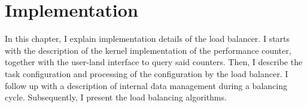 \chapter{Implementation}
\label{sec:implementation}


In this chapter, I explain implementation details of the load balancer.
I starts with the description of the kernel implementation of the performance
counter, together with the user-land interface to query said counters.
Then, I describe the task configuration and processing of the configuration by
the load balancer.
I follow up with a description of internal data management during a balancing cycle.
Subsequently, I present the load balancing algorithms.







\cleardoublepage

